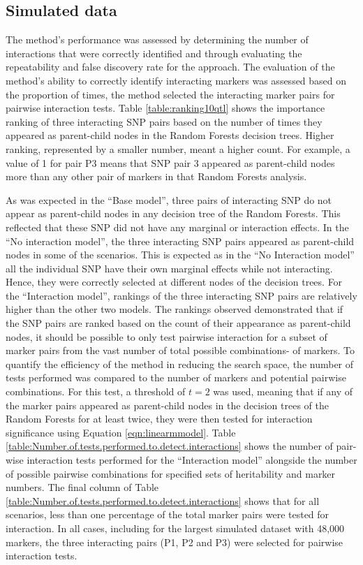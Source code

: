 \documentclass[preprint,12pt,3p]{elsarticle}
\begin{document}
\subsection{Simulated data}
The method's performance was assessed by determining the number of interactions that were correctly identified and
through evaluating the repeatability and false discovery rate for the approach.  The evaluation of the method's ability
to correctly identify interacting markers was assessed based on the proportion of times, the method selected the
interacting marker pairs for pairwise interaction tests. Table  \ref{table:ranking10qtl} shows the importance ranking of three interacting SNP
pairs based on the number of times they appeared as parent-child nodes in the Random Forests decision trees. Higher
ranking, represented by a smaller number, meant a higher count.  For example, a value of 1 for pair P3 means that SNP
pair 3 appeared as parent-child nodes more than any other pair of markers in that Random Forests analysis.


As was expected in the ``Base model'', three pairs of interacting SNP do not appear as parent-child nodes in any decision
tree of the Random Forests. This reflected that these SNP did not have any marginal or interaction effects. In the ``No
interaction model'', the three interacting SNP pairs appeared as parent-child nodes in some of the scenarios. This is
expected as in the ``No Interaction model'' all the individual SNP have their own marginal effects while not
interacting. Hence, they were correctly selected at different nodes of the decision trees.  For the ``Interaction model'',
rankings of the three interacting SNP pairs are relatively higher than the other two models. The rankings observed
demonstrated that if the SNP pairs are ranked based on the count of their appearance as parent-child nodes, it should be
possible to only test pairwise interaction for a subset of marker pairs from the vast number of total possible combinations-
 of markers.  To quantify the efficiency of the method in reducing the search space, the number of tests performed
was compared to the number of markers and potential pairwise combinations. For this test, a threshold of $t = 2$ was
used, meaning that if any of the marker pairs appeared as parent-child nodes in the decision trees of the Random Forests
for at least twice, they were then tested for interaction significance using Equation \ref{eqn:linearmmodel}. Table  \ref{table:Number.of.tests.performed.to.detect.interactions} shows the number of
pair-wise interaction tests performed for the ``Interaction model'' alongside the number of possible pairwise combinations
for specified sets of heritability and marker numbers. The final column of Table  \ref{table:Number.of.tests.performed.to.detect.interactions} shows that for all scenarios, less
than one percentage of the total marker pairs were tested for interaction.  In all cases, including for the largest
simulated dataset with 48,000 markers, the three interacting pairs (P1, P2 and P3) were selected for pairwise
interaction tests.
\end{document}

